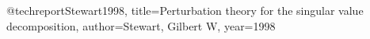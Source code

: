 \documentclass[letterpaper, 10 pt, conference]{ieeeconf}  %
\begin{document}
	
	
	
	
	
	
	
	
	
	{\small
		
		
		@techreport{Stewart1998,
			title={Perturbation theory for the singular value decomposition},
			author={Stewart, Gilbert W},
			year={1998}
		}
		
	}
\end{document}
